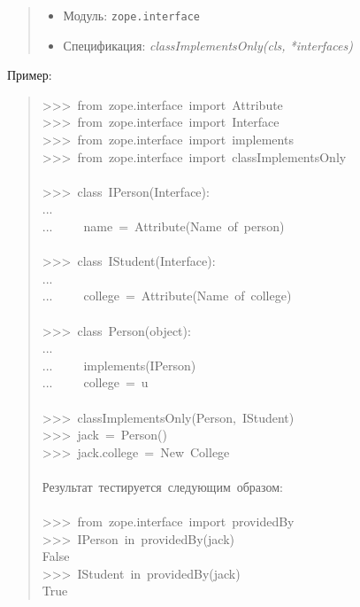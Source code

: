 \documentclass[a4paper,openany,twoside,final]{book}
\providecommand*{\DUroletitlereference}[1]{\textsl{#1}}
\begin{document}
\begin{quote}

\begin{itemize}

\item Модуль: \texttt{zope.interface}

\item Спецификация: \DUroletitlereference{classImplementsOnly(cls, *interfaces)}

\end{itemize}

\end{quote}

Пример:

\begin{quote}{\ttfamily \raggedright \noindent
>{}>{}>~from~zope.interface~import~Attribute\\
>{}>{}>~from~zope.interface~import~Interface\\
>{}>{}>~from~zope.interface~import~implements\\
>{}>{}>~from~zope.interface~import~classImplementsOnly\\
~\\
>{}>{}>~class~IPerson(Interface):\\
...\\
...~~~~~name~=~Attribute(\textquotedbl{}Name~of~person\textquotedbl{})\\
~\\
>{}>{}>~class~IStudent(Interface):\\
...\\
...~~~~~college~=~Attribute(\textquotedbl{}Name~of~college\textquotedbl{})\\
~\\
>{}>{}>~class~Person(object):\\
...\\
...~~~~~implements(IPerson)\\
...~~~~~college~=~u\textquotedbl{}\textquotedbl{}\\
~\\
>{}>{}>~classImplementsOnly(Person,~IStudent)\\
>{}>{}>~jack~=~Person()\\
>{}>{}>~jack.college~=~\textquotedbl{}New~College\textquotedbl{}\\
~\\
Результат~тестируется~следующим~образом:\\
~\\
>{}>{}>~from~zope.interface~import~providedBy\\
>{}>{}>~IPerson~in~providedBy(jack)\\
False\\
>{}>{}>~IStudent~in~providedBy(jack)\\
True
}
\end{quote}
\end{document}

